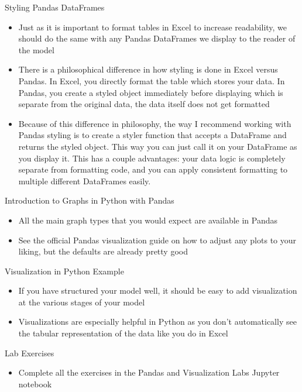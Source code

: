 \documentclass[]{article}
\begin{document}
\begin{section}{Styling Pandas DataFrames}
\begin{itemize}
\item Just as it is important to format tables in Excel to increase readability, we should do the same with any Pandas DataFrames we display to the reader of the model
\item There is a philosophical difference in how styling is done in Excel versus Pandas. In Excel, you directly format the table which stores your data. In Pandas, you create a styled object immediately before displaying which is separate from the original data, the data itself does not get formatted
\item Because of this difference in philosophy, the way I recommend working with Pandas styling is to create a styler function that accepts a DataFrame and returns the styled object. This way you can just call it on your DataFrame as you display it. This has a couple advantages: your data logic is completely separate from formatting code, and you can apply consistent formatting to multiple different DataFrames easily.
\end{itemize}
\end{section}
\begin{section}{Introduction to Graphs in Python with Pandas}
\begin{itemize}
\item All the main graph types that you would expect are available in Pandas
\item See the official Pandas visualization guide on how to adjust any plots to your liking, but the defaults are already pretty good
\end{itemize}
\end{section}
\begin{section}{Visualization in Python Example}
\begin{itemize}
\item If you have structured your model well, it should be easy to add visualization at the various stages of your model
\item Visualizations are especially helpful in Python as you don't automatically see the tabular representation of the data like you do in Excel
\end{itemize}
\end{section}
\begin{section}{Lab Exercises}
\begin{itemize}
\item Complete all the exercises in the Pandas and Visualization Labs Jupyter notebook
\end{itemize}
\end{section}
\end{document}
